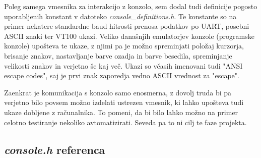\documentclass[12pt,a4paper,twoside,openright,slovene]{book}
\begin{document}
Poleg samega vmesnika za interakcijo z konzolo, sem dodal tudi definicije pogosto uporabljenih konstant v datoteko \textit{console\_definitions.h}. Te konstante so na primer nekatere standardne baud hitrosti prenosa podatkov po UART, posebni ASCII znaki ter VT100 ukazi. Veliko današnjih emulatorjev konzole (programske konzole) upošteva te ukaze, z njimi pa je možno spreminjati položaj kurzorja, brisanje znakov, nastavljanje barve ozadja in barve besedila, spreminjanje velikosti znakov in verjetno še kaj več. Ukazi so včasih imenovani tudi "ANSI escape codes", saj je prvi znak zaporedja vedno ASCII vrednost za "escape".

Zaenkrat je komunikacija s konzolo samo enosmerna, z dovolj truda bi pa verjetno bilo povsem možno izdelati ustrezen vmesnik, ki lahko upošteva tudi ukaze dobljene z računalnika. To pomeni, da bi bilo lahko možno na primer celotno testiranje nekoliko avtomatizirati. Seveda pa to ni cilj te faze projekta.

\subsection{\textit{console.h} referenca}
\end{document}
